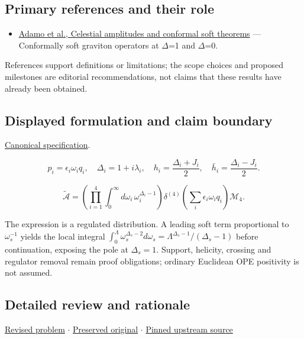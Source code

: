 \documentclass[
  11pt,
]{article}
\providecommand{\tightlist}{%
  \setlength{\itemsep}{0pt}\setlength{\parskip}{0pt}}
\begin{document}
\subsection{Primary references and their role}

\begin{itemize}
\tightlist
\item
  \href{https://www.pure.ed.ac.uk/ws/files/121747399/Adamo_2019_Class._Quantum_Grav._36_205018_1_.pdf}{Adamo
  et al., Celestial amplitudes and conformal soft theorems} ---
  Conformally soft graviton operators at \ensuremath{\Delta}=1 and
  \ensuremath{\Delta}=0.
\end{itemize}

References support definitions or limitations; the scope choices and
proposed milestones are editorial recommendations, not claims that these
results have already been obtained.

\subsection{Displayed formulation and claim boundary}

\href{https://github.com/rick-stevens-ai/Pure-Thought/blob/main/PRDs/03-Celestial-CFT-Bootstrap.md}{Canonical
specification}.

\[p_i=\epsilon_i\omega_i q_i,\quad
\Delta_i=1+i\lambda_i,\quad
h_i=\frac{\Delta_i+J_i}{2},\quad
\bar h_i=\frac{\Delta_i-J_i}{2}.\]

\[\widetilde{\mathcal A}=
\left(\prod_{i=1}^4\int_0^\infty d\omega_i\,\omega_i^{\Delta_i-1}\right)
\delta^{(4)}\!\left(\sum_i\epsilon_i\omega_iq_i\right)\mathcal M_4.\]

The expression is a regulated distribution. A leading soft term
proportional to \(\omega_s^{-1}\) yields the local integral
\(\int_0^\Lambda\omega_s^{\Delta_s-2}d\omega_s=\Lambda^{\Delta_s-1}/(\Delta_s-1)\)
before continuation, exposing the pole at \(\Delta_s=1\). Support,
helicity, crossing and regulator removal remain proof obligations;
ordinary Euclidean OPE positivity is not assumed.

\subsection{Detailed review and rationale}

\href{https://github.com/rick-stevens-ai/Pure-Thought/blob/main/PRDs/03-Celestial-CFT-Bootstrap.md}{Revised
problem} \ensuremath{\cdot}
\href{https://github.com/rick-stevens-ai/Pure-Thought/blob/main/archive/original-PRDs/03-Celestial-CFT-Bootstrap.md}{Preserved
original} \ensuremath{\cdot}
\href{https://github.com/rick-stevens-ai/Pure-Thought/blob/f854d4e12b55c1f5b5c2a964b75f2d23496d981e/PRDs/03-Celestial-CFT-Bootstrap.md}{Pinned
upstream source}
\end{document}
